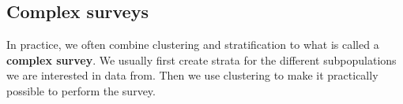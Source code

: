 \documentclass{article}
\begin{document}
\begin{example}
  
%
%




  
\end{example}

\subsection{Complex surveys} \label{sec:complexSurveys}

In practice, we often combine clustering and stratification to what is called a
\textbf{complex survey}. We usually first create strata for the different subpopulations
we are interested in data from. Then we use clustering to make it
practically possible to perform the survey.
\end{document}
